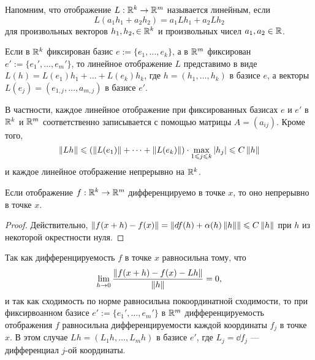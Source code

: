 \documentclass[a4paper]{article}
\theoremstyle{named}
\begin{document}
    \begin{remark*}
        Напомним, что отображение $L: \mathbb{R}^k \to \mathbb{R}^m$ называется линейным, если
        \begin{equation*}
            L(a_1h_1 + a_2h_2) = a_1Lh_1 + a_2Lh_2
        \end{equation*}
        для произвольных векторов $h_1, h_2, \in \mathbb{R}^k$ и произвольных чисел $a_1, a_2 \in \mathbb{R}$. 
        
        Если в $\mathbb{R}^k$ фиксирован базис $e := \{e_1, \dots, e_k\}$, а в $\mathbb{R}^m$ фиксирован $e' := \{e_1', \dots, e_m'\}$, то линейное отображение $L$ представимо в виде $L(h) = L(e_1)h_1 + \dots + L(e_k)h_k$, где $h = (h_1, \dots, h_k)$ в базисе $e$, а векторы $L(e_j) = (e_{1,j}, \dots, a_{m, j})$ в базисе $e'$. 

        В частности, каждое линейное отображение при фиксированных базисах $e$ и $e'$ в $\mathbb{R}^k$ и $\mathbb{R}^m$ соответственно записывается с помощью матрицы $A = (a_{ij})$. Кроме того,
        \begin{equation*}
            \left\lVert Lh\right\rVert \leqslant (\left\lVert L(e_1)\right\rVert + \dots + \left\lVert L(e_k)\right\rVert) \cdot \max\limits_{1 \leqslant j \leqslant k} |h_j| \leqslant C \left\lVert h\right\rVert
        \end{equation*}
        и каждое линейное отображение непрерывно на $\mathbb{R}^k$.
    \end{remark*}

    \begin{consequence*}
        Если отображение $f: \mathbb{R}^k \to \mathbb{R}^m$ дифференцируемо в точке $x$, то оно непрерывно в точке $x$.
    \end{consequence*}

    \begin{proof}
        Действительно, $\left\lVert f(x + h) - f(x)\right\rVert = \left\lVert\mathop{}\!d f(h) + \alpha(h)\left\lVert h\right\rVert\right\rVert \leqslant C\left\lVert h\right\rVert$ при $h$ из некоторой окрестности нуля.
    \end{proof}

    \begin{remark*}
        Так как дифференцируемость $f$ в точке $x$ равносильна тому, что
        \begin{equation*}
            \lim_{h \to 0} \dfrac{\left\lVert f(x + h) - f(x) - Lh\right\rVert}{\left\lVert h\right\rVert} = 0,
        \end{equation*}
        и так как сходимость по норме равносильна покоординатной сходимости, то при фиксирвоанном базисе $e' := \{e_1', \dots, e_m'\}$ в $\mathbb{R}^m$ дифференцируемость отображения $f$ равносильна дифференцируемости каждой координаты $f_j$ в точке $x$. В этом случае $Lh = (L_1h, \dots, L_mh)$ в базисе $e'$, где $L_j = \dd f_j$ --- дифференциал $j$-ой координаты.
    \end{remark*}
\end{document}
